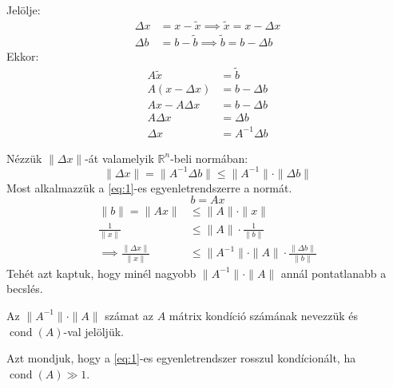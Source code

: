 Jelölje:
\begin{align*}
    \Delta x & = x- \tilde{x} \implies \tilde{x} = x - \Delta x \\
    \Delta b & = b - \tilde{b} \implies \tilde{b} = b - \Delta b
\end{align*}
Ekkor:
\begin{align*}
A\tilde{x} & = \tilde{b} \\
A(x - \Delta x) & = b - \Delta b \\
Ax - A\Delta x & = b - \Delta b \\ 
A\Delta x & = \Delta b \\
\Delta x & = A^{-1}\Delta b
\end{align*}

Nézzük $\| \Delta x \|$-át valamelyik $\mathbb{R}^{n}$-beli normában:
\begin{equation*}
    \| \Delta x \|  = \| A^{-1}\Delta b \| \leq \| A^{-1} \|  \cdot \| \Delta b \| 
\end{equation*}
Most alkalmazzük a \ref{eq:1}-es egyenletrendszerre a normát.
\begin{equation*}
    b = Ax
\end{equation*}
\begin{align*}
    \| b \|  = \| Ax \| & \leq \| A \| \cdot \| x \| \\
    \frac{1}{\| x \| } & \leq \| A \|  \cdot \frac{1}{\| b \| } \\
    \implies \frac{\| \Delta x \| }{\| x \| } & \leq \| A^{-1} \|  \cdot \| A \|  \cdot \frac{\| \Delta b \| }{\| b \| }
\end{align*}
Tehét azt kaptuk, hogy minél nagyobb $\| A^{-1} \|  \cdot \| A \|$ annál pontatlanabb a becslés.

\begin{definition}
    Az $\| A^{-1} \|  \cdot \| A \|$ számat az $A$ mátrix kondíció számának nevezzük és $\operatorname{cond}(A)$-val jelöljük.
\end{definition}

\begin{definition}
    Azt mondjuk, hogy a \ref{eq:1}-es egyenletrendszer rosszul kondícionált, ha $\operatorname{cond}(A) \gg 1$.
\end{definition}

